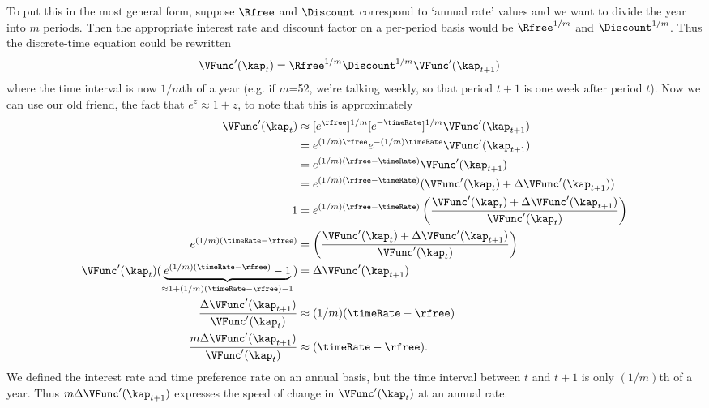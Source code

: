 \documentclass{handout}
\begin{document}
To put this in the most general form, suppose $\Rfree$ and $\Discount$ 
correspond to `annual rate' values and we want to divide the year into 
$m$ periods.  Then the appropriate interest rate and discount factor 
on a per-period basis would be $\Rfree^{1/m}$ and $\Discount^{1/m}$.  Thus the
discrete-time equation could be rewritten
\begin{equation}\begin{gathered}\begin{aligned}
        \VFunc^{\prime}(\kap_{t}) & =  \Rfree^{1/m}\Discount^{1/m} \VFunc^{\prime}(\kap_{t+1})
\end{aligned}\end{gathered}\end{equation}
where the time interval is now $1/m$th of a year (e.g.  if $m$=52, 
we're talking weekly, so that period $t+1$ is one week after period 
$t$).  Now we can use our old friend, the fact that $e^{z} \approx 1+z$,
to note that this is approximately 
\begin{equation}\begin{gathered}\begin{aligned}
        \VFunc^{\prime}(\kap_{t}) & \approx  [e^{\rfree}]^{1/m}[e^{-\timeRate}]^{1/m} \VFunc^{\prime}(\kap_{t+1})  
\\   & =  e^{(1/m)\rfree}e^{-(1/m)\timeRate} \VFunc^{\prime}(\kap_{t+1})       
\\       & =  e^{(1/m)(\rfree-\timeRate)} \VFunc^{\prime}(\kap_{t+1})  
\\       & =  e^{(1/m)(\rfree-\timeRate)} (\VFunc^{\prime}(\kap_{t})+\Delta \VFunc^{\prime}(\kap_{t+1}))
\\      1 & =  e^{(1/m)(\rfree-\timeRate)} \left(\frac{\VFunc^{\prime}(\kap_{t})+\Delta \VFunc^{\prime}(\kap_{t+1})}{\VFunc^{\prime}(\kap_{t})}\right)
\\      e^{(1/m)(\timeRate-\rfree)} & =  \left(\frac{\VFunc^{\prime}(\kap_{t})+\Delta \VFunc^{\prime}(\kap_{t+1})}{\VFunc^{\prime}(\kap_{t})}\right)
\\ \VFunc^{\prime}(\kap_{t})(\underbrace{e^{(1/m)(\timeRate - \rfree)}-1}_{\approx 1+(1/m)(\timeRate-\rfree)-1}) & =  \Delta \VFunc^{\prime}(\kap_{t+1})
\\  \frac{\Delta \VFunc^{\prime}(\kap_{t+1})}{\VFunc^{\prime}(\kap_{t})}                  & \approx  (1/m)(\timeRate - \rfree) 
\\  \frac{m\Delta \VFunc^{\prime}(\kap_{t+1})}{\VFunc^{\prime}(\kap_{t})}             & \approx  (\timeRate - \rfree) \label{eq:vpk}
.
\end{aligned}\end{gathered}\end{equation}
We defined the interest rate and time preference
rate on an annual basis, but the time interval between $t$ and $t+1$
is only $(1/m)$th of a year.  Thus $m \Delta \VFunc^{\prime}(\kap_{t+1})$ expresses
the speed of change in $\VFunc^{\prime}(\kap_{t})$ at an annual rate.
\end{document}
